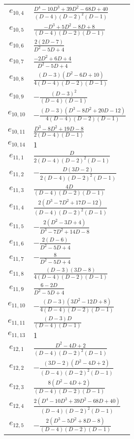 \documentclass[a4paper,11pt]{article}
\begin{document}
\begin{longtable}{|c|l|}
    $e_{10, 4}$ & $\frac{D^4-10 D^3+39 D^2-68 D+40}{(D-4) (D-2)^2 (D-1)}$ \\
    $e_{10, 5}$ & $\frac{-D^3+5 D^2-8 D+8}{(D-4) (D-2) (D-1)}$ \\
    $e_{10, 6}$ & $\frac{2 (2 D-7)}{D^2-5 D+4}$ \\
    $e_{10, 7}$ & $\frac{-2 D^2+6 D+4}{D^2-5 D+4}$ \\
    $e_{10, 8}$ & $\frac{(D-3) \left(D^2-6 D+10\right)}{4 (D-4) (D-2) (D-1)}$ \\
    $e_{10, 9}$ & $-\frac{(D-3)^2}{(D-4) (D-1)}$ \\
    $e_{10, 10}$ & $-\frac{(D-3) \left(D^3-8 D^2+20 D-12\right)}{4 (D-4) (D-2) (D-1)}$ \\
    $e_{10, 11}$ & $\frac{D^3-8 D^2+19 D-8}{2 (D-4) (D-1)}$ \\
    $e_{10, 14}$ & $1$ \\
    \hline
    $e_{11, 1}$ & $\frac{D}{2 (D-4) (D-2)^2 (D-1)}$ \\
    $e_{11, 2}$ & $-\frac{D (3 D-2)}{2 (D-4) (D-2)^2 (D-1)}$ \\
    $e_{11, 3}$ & $\frac{4 D}{(D-4) (D-2) (D-1)}$ \\
    $e_{11, 4}$ & $\frac{2 \left(D^3-7 D^2+17 D-12\right)}{(D-4) (D-2)^2 (D-1)}$ \\
    $e_{11, 5}$ & $-\frac{2 \left(D^2-3 D+4\right)}{D^3-7 D^2+14 D-8}$ \\
    $e_{11, 6}$ & $-\frac{2 (D-6)}{D^2-5 D+4}$ \\
    $e_{11, 7}$ & $-\frac{8}{D^2-5 D+4}$ \\
    $e_{11, 8}$ & $\frac{(D-3) (3 D-8)}{4 (D-4) (D-2) (D-1)}$ \\
    $e_{11, 9}$ & $\frac{6-2 D}{D^2-5 D+4}$ \\
    $e_{11, 10}$ & $-\frac{(D-3) \left(3 D^2-12 D+8\right)}{4 (D-4) (D-2) (D-1)}$ \\
    $e_{11, 11}$ & $\frac{(D-3) D}{(D-4) (D-1)}$ \\
    $e_{11, 13}$ & $1$ \\
    \hline
    $e_{12, 1}$ & $\frac{D^2-4 D+2}{(D-4) (D-2)^2 (D-1)}$ \\
    $e_{12, 2}$ & $-\frac{(3 D-2) \left(D^2-4 D+2\right)}{(D-4) (D-2)^2 (D-1)}$ \\
    $e_{12, 3}$ & $\frac{8 \left(D^2-4 D+2\right)}{(D-4) (D-2) (D-1)}$ \\
    $e_{12, 4}$ & $\frac{2 \left(D^4-10 D^3+39 D^2-68 D+40\right)}{(D-4) (D-2)^2 (D-1)}$ \\
    $e_{12, 5}$ & $-\frac{2 \left(D^3-5 D^2+8 D-8\right)}{(D-4) (D-2) (D-1)}$ \\

\end{longtable}
\end{document}
